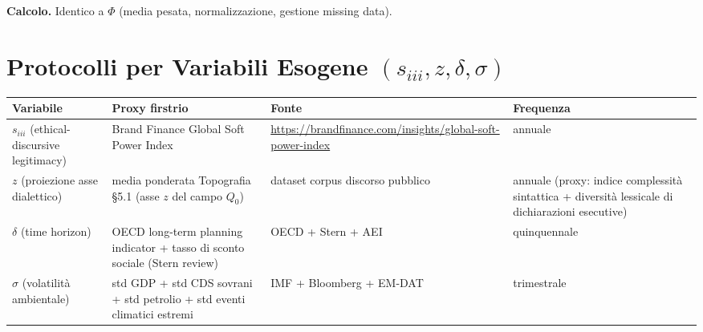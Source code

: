 \Hypoth{} \textbf{Calcolo.} Identico a \(\Phi\) (media pesata,
normalizzazione, gestione missing data).



\section{\texorpdfstring{Protocolli per Variabili Esogene
\((s_{iii}, z, \delta, \sigma)\)}{Protocolli per Variabili Esogene (s\_\{iii\}, z, \textbackslash delta, \textbackslash sigma)}}\label{protocolli-per-variables-esogene-s_iii-z-delta-sigma}

{\def\LTcaptype{none} %
{\small\begin{longtable}[]{@{}
  >{\raggedright\arraybackslash}p{}
  >{\raggedright\arraybackslash}p{}
  >{\raggedright\arraybackslash}p{}
  >{\raggedright\arraybackslash}p{}@{}}
\toprule\noalign{}
\begin{minipage}[b]{\linewidth}\raggedright
Variabile
\end{minipage} & \begin{minipage}[b]{\linewidth}\raggedright
Proxy firstrio
\end{minipage} & \begin{minipage}[b]{\linewidth}\raggedright
Fonte
\end{minipage} & \begin{minipage}[b]{\linewidth}\raggedright
Frequenza
\end{minipage} \\
\midrule\noalign{}
\endhead
\bottomrule\noalign{}
\endlastfoot
\(s_{iii}\) (ethical-discursive legitimacy) & Brand Finance Global Soft
Power Index &
\url{https://brandfinance.com/insights/global-soft-power-index} &
annuale \\
\(z\) (proiezione asse dialettico) & media ponderata Topografia \S{}5.1
(asse \(z\) del campo \(Q_0\)) & dataset corpus discorso pubblico &
annuale (proxy: indice complessità sintattica + diversità lessicale di
dichiarazioni esecutive) \\
\(\delta\) (time horizon) & OECD long-term planning indicator +
tasso di sconto sociale (Stern review) & OECD + Stern + AEI &
quinquennale \\
\(\sigma\) (volatilità ambientale) & std GDP + std CDS sovrani + std
petrolio + std eventi climatici estremi & IMF + Bloomberg + EM-DAT &
trimestrale \\
\end{longtable}}
}

